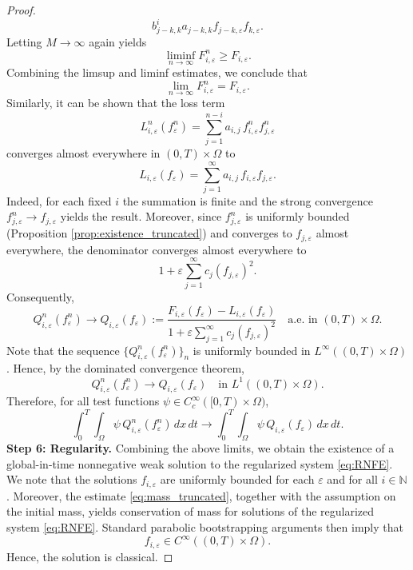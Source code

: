\documentclass[a4paper,12pt,reqno]{amsart}
\theoremstyle{plain}
\numberwithin{equation}{section}
\begin{document}
\begin{proof}
\[		b_{j-k,k}^i a_{j-k,k}
		f_{j-k,\varepsilon} f_{k,\varepsilon}.
		\]
		Letting \(M\to\infty\) again yields
		\[
		\liminf_{n\to\infty} F_{i,\varepsilon}^n
		\ge F_{i,\varepsilon}.
		\]
		Combining the limsup and liminf estimates, we conclude that
		\[
		\lim_{n\to\infty} F_{i,\varepsilon}^n = F_{i,\varepsilon}.
		\]
		Similarly, it can be shown that the loss term
		\[
		L_{i,\varepsilon}^n(f_\varepsilon^n)
		=
		\sum_{j=1}^{n-i} a_{i,j}\, f_{i,\varepsilon}^n f_{j,\varepsilon}^n
		\]
		converges almost everywhere in $(0,T)\times\Omega$ to
		\[
		L_{i,\varepsilon}(f_\varepsilon)
		=
		\sum_{j=1}^{\infty} a_{i,j}\, f_{i,\varepsilon} f_{j,\varepsilon}.
		\]
		Indeed, for each fixed $i$ the summation is finite and the strong
		convergence $f_{j,\varepsilon}^n \to f_{j,\varepsilon}$ yields the
		result. Moreover, since $f_{j,\varepsilon}^n$ is uniformly bounded (Proposition \ref{prop:existence_truncated}) and converges to $f_{j,\varepsilon}$ almost everywhere, the denominator converges almost everywhere to
		\[
		1+\varepsilon\sum_{j=1}^{\infty} c_j (f_{j,\varepsilon})^2.
		\]
		Consequently,
		\[
		Q_{i,\varepsilon}^n(f_\varepsilon^n)
		\longrightarrow
		Q_{i,\varepsilon}(f_\varepsilon)
		:=
		\frac{F_{i,\varepsilon}(f_\varepsilon)-L_{i,\varepsilon}(f_\varepsilon)}
		{1+\varepsilon\displaystyle\sum_{j=1}^{\infty} c_j (f_{j,\varepsilon})^2}
		\quad \text{a.e. in } (0,T)\times\Omega.
		\]
		Note that the sequence $\{Q_{i,\varepsilon}^n(f_\varepsilon^n)\}_n$
		is uniformly bounded in $L^{\infty}((0,T)\times\Omega)$.
		Hence, by the dominated convergence theorem,
		\[
		Q_{i,\varepsilon}^n(f_\varepsilon^n)
		\longrightarrow
		Q_{i,\varepsilon}(f_\varepsilon)
		\quad \text{in } L^1((0,T)\times\Omega).
		\]
		Therefore, for all test functions
		$\psi \in C_c^{\infty}([0,T)\times\Omega)$,
		\[
		\int_0^T \int_\Omega
		\psi\, Q_{i,\varepsilon}^n(f_\varepsilon^n)\,dx\,dt
		\longrightarrow
		\int_0^T \int_\Omega
		\psi\, Q_{i,\varepsilon}(f_\varepsilon)\,dx\,dt.
		\]
		\textbf{Step 6: Regularity.}
		Combining the above limits, we obtain the existence of a global-in-time nonnegative weak
		solution to the regularized system \eqref{eq:RNFE}. We note that the solutions
		$f_{i,\varepsilon}$ are uniformly bounded for each $\varepsilon$ and for all
		$i \in \mathbb{N}$. Moreover, the estimate \eqref{eq:mass_truncated}, together with the
		assumption on the initial mass, yields conservation of mass for solutions of the
		regularized system \eqref{eq:RNFE}. Standard parabolic bootstrapping arguments then imply
		that
		\[
		f_{i,\varepsilon} \in C^\infty((0,T)\times\Omega).
		\]
		Hence, the solution is classical.
	\end{proof}
	
\end{document}
